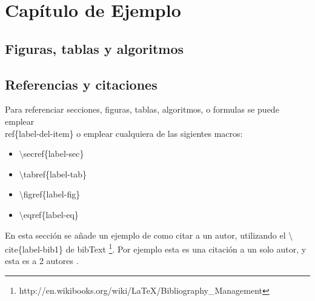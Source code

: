 \chapter{Capítulo de Ejemplo}

\section{Figuras, tablas y algoritmos}

\section{Referencias y citaciones}

Para referenciar secciones, figuras, tablas, algoritmos, o formulas se puede
emplear \\ref\{label-del-item\} o emplear cualquiera de las sigientes macros:


\begin{itemize}
\item $\setminus$secref\{label-sec\}
\item $\setminus$tabref\{label-tab\}
\item $\setminus$figref\{label-fig\}
\item $\setminus$eqref\{label-eq\}
\end{itemize}

En esta sección se añade un ejemplo de como citar a un autor, utilizando
el $\setminus$cite\{label-bib1\} de bibText \footnote{http://en.wikibooks.org/wiki/LaTeX/Bibliography\_Management}.
Por ejemplo esta es una citación \cite{griffiths1997learning} a un solo
autor, y esta es a 2 autores \cite{griffiths1997learning, lamport1985i1}.
